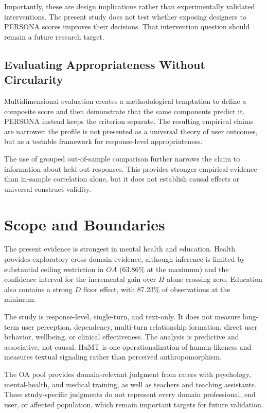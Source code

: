 \documentclass[manuscript,review,anonymous]{acmart}
\begin{document}
Importantly, these are design implications rather than experimentally validated interventions. The present study does not test whether exposing designers to PERSONA scores improves their decisions. That intervention question should remain a future research target.

\subsection{Evaluating Appropriateness Without Circularity}

Multidimensional evaluation creates a methodological temptation to define a composite score and then demonstrate that the same components predict it. PERSONA instead keeps the criterion separate. The resulting empirical claims are narrower: the profile is not presented as a universal theory of user outcomes, but as a testable framework for response-level appropriateness.

The use of grouped out-of-sample comparison further narrows the claim to information about held-out responses. This provides stronger empirical evidence than in-sample correlation alone, but it does not establish causal effects or universal construct validity.

\section{Scope and Boundaries}

The present evidence is strongest in mental health and education. Health provides exploratory cross-domain evidence, although inference is limited by substantial ceiling restriction in $OA$ (63.86\% at the maximum) and the confidence interval for the incremental gain over $H$ alone crossing zero. Education also contains a strong $D$ floor effect, with 87.23\% of observations at the minimum.

The study is response-level, single-turn, and text-only. It does not measure long-term user perception, dependency, multi-turn relationship formation, direct user behavior, wellbeing, or clinical effectiveness. The analysis is predictive and associative, not causal. HuMT is one operationalization of human-likeness and measures textual signaling rather than perceived anthropomorphism.

The OA pool provides domain-relevant judgment from raters with psychology, mental-health, and medical training, as well as teachers and teaching assistants. These study-specific judgments do not represent every domain professional, end user, or affected population, which remain important targets for future validation.
\end{document}
